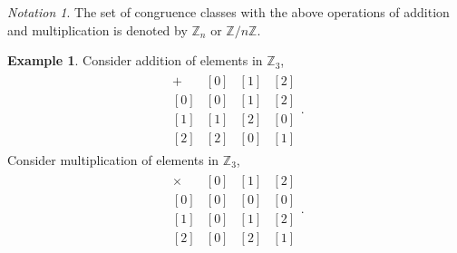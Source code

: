 \documentclass{amsbook}
\theoremstyle{plain}
\theoremstyle{definition}
\newtheorem{example}[theorem]{Example}
\theoremstyle{remark}
\newtheorem{notation}[theorem]{Notation}
\numberwithin{equation}{chapter}
\numberwithin{figure}{chapter}
\newcommand{\Z}{\mathbb{Z}}
\begin{document}
\begin{notation}
The set of congruence classes with the above operations of addition and multiplication is denoted by $\Z_n$ or $\Z / n\Z$.
\end{notation}
\begin{example}
  Consider addition of elements in $\Z_3$,
  \begin{align}
    \begin{array}{c|ccc}
       +  & [0] & [1] & [2] \\[0mm] \hline %
      [0] & [0] & [1] & [2] \\[0mm] 
      [1] & [1] & [2] & [0] \\[0mm]
      [2] & [2] & [0] & [1]
    \end{array}.
  \end{align}
  Consider multiplication of elements in $\Z_3$,
  \begin{align}
    \begin{array}{c|ccc}
  \times  & [0] & [1] & [2] \\[0mm] \hline
      [0] & [0] & [0] & [0] \\[0mm] 
      [1] & [0] & [1] & [2] \\[0mm]
      [2] & [0] & [2] & [1]
    \end{array}.
  \end{align}
\end{example}
\end{document}
